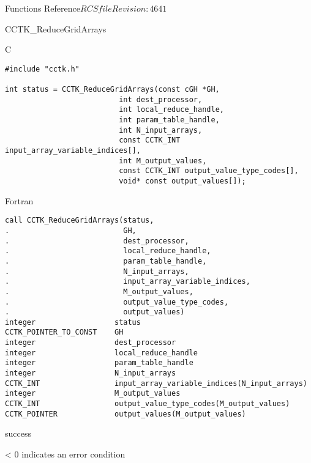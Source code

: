 \begin{cactuspart}{ Functions Reference}{$RCSfile$}{$Revision: 4641 $}
\begin{FunctionDescription}{CCTK\_ReduceGridArrays}
\begin{SynopsisSection}
\begin{Synopsis}{C}
\begin{verbatim}
#include "cctk.h"

int status = CCTK_ReduceGridArrays(const cGH *GH,
                          int dest_processor,
                          int local_reduce_handle,
                          int param_table_handle,
                          int N_input_arrays,
                          const CCTK_INT input_array_variable_indices[],
                          int M_output_values,
                          const CCTK_INT output_value_type_codes[],
                          void* const output_values[]);
\end{verbatim}
\end{Synopsis}
\begin{Synopsis}{Fortran}
\begin{verbatim}
call CCTK_ReduceGridArrays(status,
.                          GH,
.                          dest_processor,
.                          local_reduce_handle,
.                          param_table_handle,
.                          N_input_arrays,
.                          input_array_variable_indices,
.                          M_output_values,
.                          output_value_type_codes,
.                          output_values)
integer                  status
CCTK_POINTER_TO_CONST    GH
integer                  dest_processor
integer                  local_reduce_handle
integer                  param_table_handle
integer                  N_input_arrays
CCTK_INT                 input_array_variable_indices(N_input_arrays)
integer                  M_output_values
CCTK_INT                 output_value_type_codes(M_output_values)
CCTK_POINTER             output_values(M_output_values)
\end{verbatim}
\end{Synopsis}
\end{SynopsisSection}

\begin{ResultSection}
\begin{Result}{0} success \end{Result}
\begin{Result}{< 0} indicates an error condition \end{Result}
\end{ResultSection}


\end{FunctionDescription}
\end{cactuspart}
